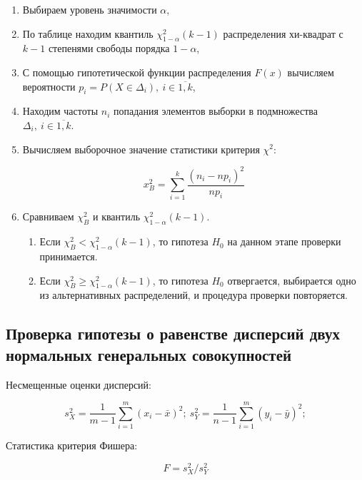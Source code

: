 \documentclass[12pt,a4paper]{article}
\begin{document}
		\begin{enumerate}
			\item Выбираем уровень значимости \( \alpha \),
			\item По таблице находим квантиль \( \chi_{1-\alpha}^2 (k - 1) \)
				распределения хи-квадрат с \( k - 1 \) степенями свободы порядка
				\( 1 - \alpha \),
			\item С помощью гипотетической функции распределения \( F(x) \)
				вычисляем вероятности
				\( p_i = P(X \in \Delta_i), \ i \in \overline{1,k} \),
			\item Находим частоты \( n_i \) попадания элементов выборки в
				подмножества \( \Delta_i, \ i \in \overline{1,k} \).
			\item Вычисляем выборочное значение статистики критерия \( \chi^2 \):

			\[ x_B^2 = \sum_{i=1}^k \frac{(n_i - np_i)^2}{np_i} \]

			\item Сравниваем \( \chi_B^2 \) и квантиль
				\( \chi_{1 - \alpha}^2 (k - 1) \).

			\begin{enumerate}
				\item Если \( \chi_B^2 < \chi_{1 - \alpha}^2 (k - 1) \), то гипотеза
					\( H_0 \) на данном этапе проверки принимается.
				\item Если \( \chi_B^2 \geqslant \chi_{1 - \alpha}^2 (k - 1) \), то
					гипотеза \( H_0 \) отвергается, выбирается одно из
					альтернативных распределений, и процедура проверки
					повторяется.
			\end{enumerate}
		\end{enumerate}

		\subsection{Проверка гипотезы о равенстве дисперсий двух нормальных
			генеральных совокупностей}

		Несмещенные оценки дисперсий:

		\begin{equation} \label{eq:unbiased_estimations_of_dispersion}
			s_X^2 = \frac{1}{m - 1} \sum_{i=1}^m (x_i - \bar x)^2; \
			s_Y^2 = \frac{1}{n - 1} \sum_{i=1}^m (y_i - \bar y)^2;
		\end{equation}

		Статистика критерия Фишера:

		\begin{equation} \label{eq:fisher}
			F = s_X^2 / s_Y^2
		\end{equation}
\end{document}
